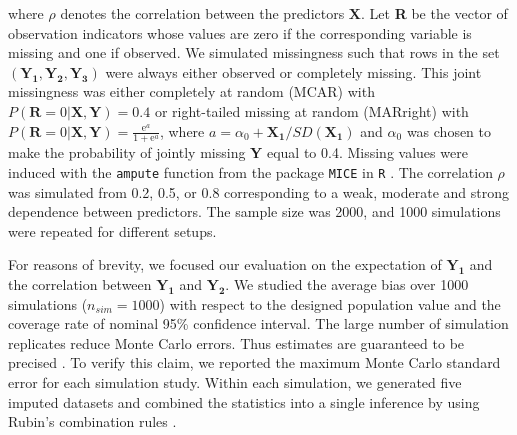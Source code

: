 	where $\rho$ denotes the correlation between the predictors $\boldsymbol{X}$. Let \textbf{R} be the vector of observation indicators whose values are zero if the corresponding variable is missing and one if observed. We simulated missingness such that rows in the set $(\boldsymbol{Y_1, Y_2, Y_3})$ were always either observed or completely missing. This joint missingness was either completely at random (MCAR) with $P(\textbf{R}=0|\textbf{X}, \textbf{Y})=0.4$ or right-tailed missing at random (MARright) with $P(\textbf{R}=0|\textbf{X}, \textbf{Y})=\frac{\mathrm{e}^a}{1+\mathrm{e}^a}$, where $a=\alpha_0+\boldsymbol{X_1}/SD(\boldsymbol{X_1})$ and $\alpha_0$ was chosen to make the probability of jointly missing \textbf{Y} equal to 0.4. Missing values were induced with the \texttt{ampute} function \citep{Schouten2018} from the package \texttt{MICE} \citep{Buuren2011} in \texttt{R} \citep{R2018}. The correlation $\rho$ was simulated from 0.2, 0.5, or 0.8 corresponding to a weak, moderate and strong dependence between predictors. The sample size was 2000, and 1000 simulations were repeated for different setups. 
	
	For reasons of brevity, we focused our evaluation on the expectation of $\boldsymbol{Y_{1}}$ and the correlation between $\boldsymbol{Y_{1}}$ and $\boldsymbol{Y_{2}}$. We studied the average bias over 1000 simulations ($n_{sim} = 1000$) with respect to the designed population value and the coverage rate of nominal 95\% confidence interval. The large number of simulation replicates reduce Monte Carlo errors. Thus estimates are guaranteed to be precised \citep{morris2019using}. To verify this claim, we reported the maximum Monte Carlo standard error for each simulation study. Within each simulation, we generated five imputed datasets and combined the statistics into a single inference by using Rubin's combination rules \citep[p.76]{RubinD1987}.
	
